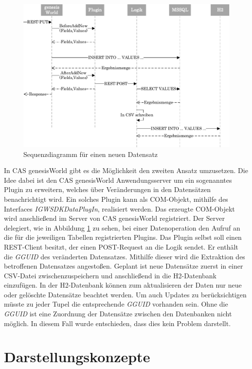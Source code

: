 \begin{figure}[htbp]
\centering
  \includegraphics[width=1.0\textwidth, width=1.0\textwidth]{pics/sequenzdiagramm.pdf}
\caption{Sequenzdiagramm für einen neuen Datensatz}
\label{konzept_sequenz}
\end{figure}

In CAS genesisWorld gibt es die Möglichkeit den zweiten Ansatz umzusetzen. Die Idee dabei ist den CAS genesisWorld Anwendungsserver um ein sogenanntes Plugin zu erweitern, welches über Veränderungen in den Datensätzen benachrichtigt wird. Ein solches Plugin kann als COM-Objekt, mithilfe des Interfaces \textit{IGWSDKDataPlugIn}, realisiert werden. Das erzeugte COM-Objekt wird anschließend im Server von CAS genesisWorld registriert. Der Server delegiert, wie in Abbildung \ref{konzept_sequenz} zu sehen, bei einer Datenoperation den Aufruf an die für die jeweiligen Tabellen registrierten Plugins. Das Plugin selbst soll einen REST-Client besitzt, der einen POST-Request an die Logik sendet. Er enthält die \textit{GGUID} des veränderten Datensatzes. Mithilfe dieser wird die Extraktion des betroffenen Datensatzes angestoßen. Geplant ist neue Datensätze zuerst in einer CSV-Datei zwischenzuspeichern und anschließend in die H2-Datenbank einzufügen. In der H2-Datenbank können zum aktualisieren der Daten nur neue oder gelöschte Datensätze beachtet werden. Um auch Updates zu berücksichtigen müsste zu jeder Tupel die entsprechende \textit{GGUID} vorhanden sein. Ohne die \textit{GGUID} ist eine Zuordnung der Datensätze zwischen den Datenbanken nicht möglich. In diesem Fall wurde entschieden, dass dies kein Problem darstellt.

\section{Darstellungskonzepte}
\label{ch:Konzeption:sec:Darstellungskonzepte}

